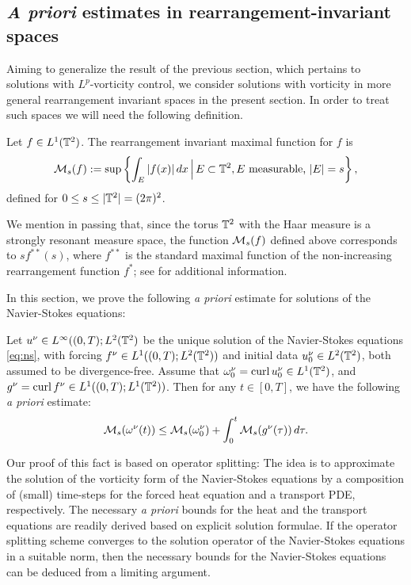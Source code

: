 \documentclass[reqno,12pt]{amsart}
\DeclareMathOperator{\curl}{curl}
\begin{document}
\subsection{{\it A priori} estimates in rearrangement-invariant spaces}
\label{sec:rinv}

Aiming to generalize the result of the previous section, which pertains to solutions with $L^p$-vorticity control, we consider solutions with vorticity in more general rearrangement invariant spaces in the present section. In order to treat such spaces we will need the following definition.

\begin{definition} \label{rearrmaxfctn}
Let $f \in L^1(\mathbb{T}^2)$. The rearrangement invariant maximal function for $f$ is
\[
\mathcal{M}_s(f) := \sup \left\{\int_E |f(x)| \, dx \, \Big| \, E \subset \mathbb{T}^2, E \text{ measurable, }|E|=s  \right\},
\]
defined for $0\le s \le |\mathbb{T}^2| = (2\pi)^2$.
\end{definition}

\begin{remark} \label{fstarstar}
We mention in passing that, since the torus $\mathbb{T}^2$ with the Haar measure is a strongly resonant measure space, the function $\mathcal{M}_s(f)$  defined above corresponds to $s f^{\ast\ast}(s)$, where $f^{\ast\ast}$ is the standard maximal function of the non-increasing rearrangement function $f^\ast$; see \cite[Chapter 2, Section 3]{BennettSharpley} for additional information.
\end{remark}

 In this section, we prove the following {\it a priori} estimate for solutions of the Navier-Stokes equations:

\begin{proposition}
  \label{prop:rearrange}
  Let $u^\nu \in L^\infty((0,T);L^2(\mathbb{T}^2)$ be the unique solution of the Navier-Stokes equations \eqref{eq:ns}, with  forcing $f^\nu \in L^1((0,T);L^2(\mathbb{T}^2))$ and  initial data $u^\nu_0\in L^2(\mathbb{T}^2)$, both assumed to be divergence-free. Assume that $\omega_0^\nu = \curl u^\nu_0  \in L^1 (\T^2)$, and $g^\nu = \curl f^\nu  \in L^1 ((0,T);L^1 (\T^2))$. Then for any $t\in [0,T]$, we have the following {\it a priori} estimate:
  \begin{align}
    \label{eq:rearrange}
  \mathcal{M}_s(\omega^\nu(t))
  \le
  \mathcal{M}_s(\omega^\nu_0)
  +
  \int_0^t \mathcal{M}_s(g^\nu(\tau)) \, d\tau.
  \end{align}
\end{proposition}


Our proof of this fact is based on operator splitting: The idea is to approximate the solution of the vorticity form of the Navier-Stokes equations by a composition of (small) time-steps for the forced heat equation and a transport PDE, respectively. The necessary {\it a priori} bounds for the heat and the transport equations are readily derived based on explicit solution formulae. If the operator splitting scheme converges to the solution operator of the Navier-Stokes equations in a suitable norm, then the necessary bounds for the Navier-Stokes equations can be deduced from a limiting argument.
\end{document}
